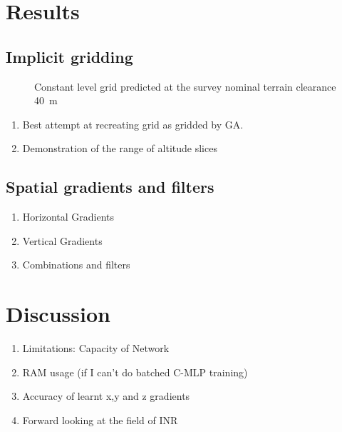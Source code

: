 \documentclass[manuscript.tex]{subfiles}
\begin{document}
\section{Results}
\subsection{Implicit gridding}
\begin{figure}
    \label{fig:grid}
    \caption[]{Constant level grid predicted at the survey nominal terrain clearance \SI{40}{m}}
\end{figure}



\begin{enumerate}
    \item{} Best attempt at recreating grid as gridded by GA\@.
    \item{} Demonstration of the range of altitude slices
\end{enumerate}

\subsection{Spatial gradients and filters}
\begin{enumerate}
    \item{} Horizontal Gradients
    \item{} Vertical Gradients
    \item{} Combinations and filters
\end{enumerate}

\section{Discussion}
\begin{enumerate}
    \item{} Limitations: Capacity of Network
    \item{} RAM usage (if I can't do batched C-MLP training)
    \item{} Accuracy of learnt x,y and z gradients
    \item{} Forward looking at the field of INR
\end{enumerate}


\end{document}
